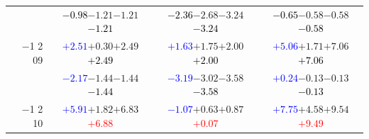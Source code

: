 \documentclass[compress]{beamer}
\begin{document}
\begin{frame}
\begin{tabular}{r | c | c | c}
          & \textcolor{black}{$-0.98$}\hspace{0.1 cm}$-1.21$\hspace{0.1 cm}$-1.21$\hspace{0.1 cm}\textcolor{black}{$-1.21$} & \textcolor{black}{$-2.36$}\hspace{0.1 cm}$-2.68$\hspace{0.1 cm}$-3.24$\hspace{0.1 cm}\textcolor{black}{$-3.24$} & \textcolor{black}{$-0.65$}\hspace{0.1 cm}$-0.58$\hspace{0.1 cm}$-0.58$\hspace{0.1 cm}\textcolor{black}{$-0.58$} \\
$-$1 2 09 & \textcolor{blue}{$+2.51$}\hspace{0.1 cm}$+0.30$\hspace{0.1 cm}$+2.49$\hspace{0.1 cm}\textcolor{black}{$+2.49$} & \textcolor{blue}{$+1.63$}\hspace{0.1 cm}$+1.75$\hspace{0.1 cm}$+2.00$\hspace{0.1 cm}\textcolor{black}{$+2.00$} & \textcolor{blue}{$+5.06$}\hspace{0.1 cm}$+1.71$\hspace{0.1 cm}$+7.06$\hspace{0.1 cm}\textcolor{black}{$+7.06$} \\
          & \textcolor{blue}{$-2.17$}\hspace{0.1 cm}$-1.44$\hspace{0.1 cm}$-1.44$\hspace{0.1 cm}\textcolor{black}{$-1.44$} & \textcolor{blue}{$-3.19$}\hspace{0.1 cm}$-3.02$\hspace{0.1 cm}$-3.58$\hspace{0.1 cm}\textcolor{black}{$-3.58$} & \textcolor{blue}{$+0.24$}\hspace{0.1 cm}$-0.13$\hspace{0.1 cm}$-0.13$\hspace{0.1 cm}\textcolor{black}{$-0.13$} \\
$-$1 2 10 & \textcolor{blue}{$+5.91$}\hspace{0.1 cm}$+1.82$\hspace{0.1 cm}$+6.83$\hspace{0.1 cm}\textcolor{red}{$+6.88$} & \textcolor{blue}{$-1.07$}\hspace{0.1 cm}$+0.63$\hspace{0.1 cm}$+0.87$\hspace{0.1 cm}\textcolor{red}{$+0.07$} & \textcolor{blue}{$+7.75$}\hspace{0.1 cm}$+4.58$\hspace{0.1 cm}$+9.54$\hspace{0.1 cm}\textcolor{red}{$+9.49$} \\

\end{tabular}
\end{frame}
\end{document}
